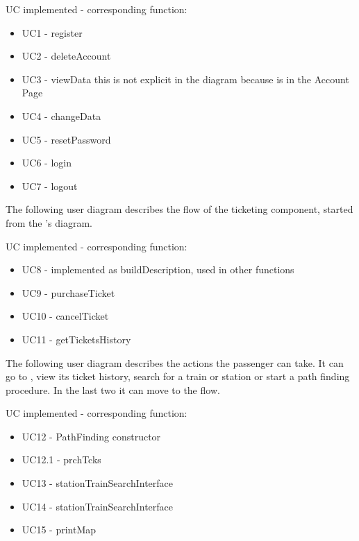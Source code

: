 UC implemented - corresponding function:
\begin{itemize}
	\item UC1 - register\\
	\item UC2 - deleteAccount\\
	\item UC3 - viewData this is not explicit in the diagram because is in the Account Page\\
	\item UC4 - changeData\\
	\item UC5 - resetPassword\\
	\item UC6 - login\\
	\item UC7 - logout\\
\end{itemize}


\newpage
{}
The following user diagram describes the flow of the ticketing component, started from the 's diagram.


UC implemented - corresponding function:
\begin{itemize}
	\item UC8 - implemented as buildDescription, used in other functions
	\item UC9 - purchaseTicket
	\item UC10 - cancelTicket
	\item UC11 - getTicketsHistory
\end{itemize}

\newpage
{}
The following user diagram describes the actions the passenger can take. It can go to , view its ticket history, search for a train or station or start a path finding procedure. In the last two it can move to the  flow.


UC implemented - corresponding function:
\begin{itemize}
	\item UC12 - PathFinding constructor
	\item UC12.1 - prchTcks
	\item UC13 - stationTrainSearchInterface
	\item UC14 - stationTrainSearchInterface
	\item UC15 - printMap
\end{itemize}

